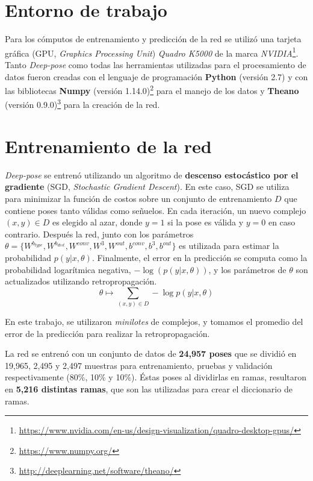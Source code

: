 \section{Entorno de trabajo}
Para los cómputos de entrenamiento y predicción de la red se utilizó
una tarjeta gráfica (GPU, \textit{Graphics Processing
Unit}) \textit{Quadro K5000} de la marca
\textit{NVIDIA}\footnote{\url{https://www.nvidia.com/en-us/design-visualization/quadro-desktop-gpus/}}.
Tanto \textit{Deep-pose} como todas las herramientas utilizadas
para el procesamiento de datos fueron creadas con el lenguaje de
programación \textbf{Python} (versión 2.7) y con las bibliotecas
\textbf{Numpy} (versión 1.14.0)\footnote{\url{https://www.numpy.org/}}
para el manejo de los datos y \textbf{Theano} (versión
0.9.0)\footnote{\url{http://deeplearning.net/software/theano/}} para la creación
de la red.

\section{Entrenamiento de la red}
\textit{Deep-pose} se entrenó utilizando un algoritmo de
\textbf{descenso estocástico por el gradiente}
(SGD, \textit{Stochastic Gradient Descent}).
En este caso, SGD se utiliza para minimizar la función de costos sobre
un conjunto de entrenamiento $D$ que contiene poses tanto válidas como
señuelos. En cada iteración, un nuevo complejo $(x,y) \in D$ es
elegido al azar, donde $y=1$ si la pose es válida y $y=0$ en caso
contrario. Después la red, junto con los parámetros $\theta
= \{W^{b_{type}}, W^{b_{dist}}, W^{conv}, W^3, W^{out}, b^{conv},
b^{3}, b^{out}\}$ es utilizada para estimar la probabilidad
$p(y|x, \theta)$. Finalmente, el error en la predicción se computa
como la probabilidad logarítmica negativa, $-\log(p(y|x, \theta))$, y
los parámetros de $\theta$ son actualizados
utilizando retropropagación.
\begin{equation}
  \theta \longmapsto \sum_{(x,y) \in D} -\log p(y|x, \theta)
\end{equation}

En este trabajo, se utilizaron \textit{minilotes} de complejos, y
tomamos el promedio del error de la predicción para realizar la
retropropagación.

La red se entrenó con un conjunto de datos de \textbf{24,957 poses}
que se dividió en 19,965, 2,495 y 2,497 muestras para entrenamiento,
pruebas y validación respectivamente (80\%, 10\% y 10\%). Éstas poses al dividirlas
en ramas, resultaron en \textbf{5,216 distintas ramas}, que son las
utilizadas para crear el diccionario de ramas.

